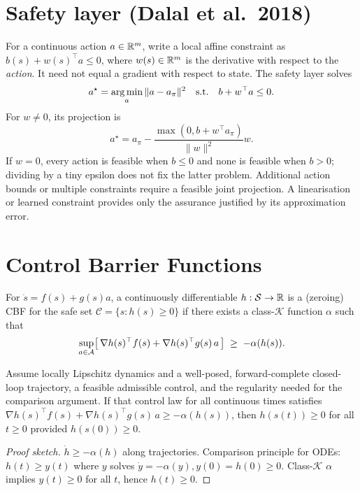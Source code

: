 \documentclass[11pt,oneside]{scrbook}
\begin{document}
\section{Safety layer (Dalal et al.\ 2018)}

For a continuous action $a\in\mathbb{R}^m$, write a local affine constraint as
$b(s)+w(s)^\top a\leq0$, where $w(s)\in\mathbb{R}^m$ is the derivative with
respect to the \emph{action}. It need not equal a gradient with respect to
state. The safety layer solves
\[
 a^\star=\operatorname*{arg\,min}_a\|a-a_\pi\|^2\quad\text{s.t.}\quad b+w^\top a\leq0.
\]
For $w\ne0$, its projection is
\begin{equation}\label{eq:dalal-projection}
 a^\star=a_\pi-\frac{\max(0,b+w^\top a_\pi)}{\|w\|^2}w.
\end{equation}
If $w=0$, every action is feasible when $b\leq0$ and none is feasible when
$b>0$; dividing by a tiny epsilon does not fix the latter problem. Additional
action bounds or multiple constraints require a feasible joint projection.
A linearisation or learned constraint provides only the assurance justified
by its approximation error.

\section{Control Barrier Functions}

\begin{definition}
For $\dot s = f(s) + g(s) a$, a continuously differentiable $h: \mathcal{S} \to \mathbb{R}$
is a (zeroing) CBF for the safe set $\mathcal{C} = \{s : h(s) \geq 0\}$ if
there exists a class-$\mathcal{K}$ function $\alpha$ such that
\[
   \sup_{a \in \mathcal{A}} \bigl[\, \nabla h(s)^\top f(s) + \nabla h(s)^\top g(s)\, a \,\bigr] \;\geq\; -\alpha(h(s)).
\]
\end{definition}

\begin{theorem}\label{thm:cbf-invariance}
Assume locally Lipschitz dynamics and a well-posed, forward-complete closed-loop trajectory, a feasible admissible control, and the regularity needed for the comparison argument. If that control law for all continuous times satisfies
$\nabla h(s)^\top f(s) + \nabla h(s)^\top g(s)\, a \geq -\alpha(h(s))$, then
$h(s(t)) \geq 0$ for all $t \geq 0$ provided $h(s(0)) \geq 0$.
\end{theorem}

\begin{proof}[Proof sketch]
$\dot h \geq -\alpha(h)$ along trajectories. Comparison principle for ODEs:
$h(t) \geq y(t)$ where $y$ solves $\dot y = -\alpha(y), y(0) = h(0) \geq 0$.
Class-$\mathcal{K}$ $\alpha$ implies $y(t) \geq 0$ for all $t$, hence
$h(t) \geq 0$.
\end{proof}
\end{document}
